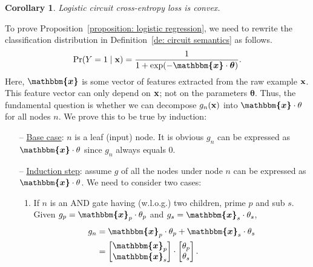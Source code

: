 \documentclass[letterpaper]{article} %
\newtheorem{corollary}{Corollary}
\newcommand{\node}{n}
\newcommand{\coe}{g}
\newcommand{\sample}{{\bf x}}
\begin{document}
\begin{corollary}
Logistic circuit cross-entropy loss is convex.
\end{corollary}

To prove Proposition~\ref{proposition: logistic regression}, we need to rewrite the classification distribution in Definition~\ref{de: circuit semantics} as follows.
$$
{\Pr} ( Y = 1 \mid {\bf x}) = \frac{1}{1+ \exp(- \bm{\mathbbm{x}} \cdot {\bm \theta})}.
$$
Here, $\bm{\mathbbm{x}}$ is some vector of features extracted from the raw example $\bf x$. This feature vector can only depend on $\bf x$; not on the parameters $\bm \theta$.
Thus, the fundamental question is whether we can decompose $\coe_n(\sample)$ into $\bm{\mathbbm{x}} \cdot {\bf \theta}$ for all nodes $n$. We prove this to be true by induction:
\begin{itemize}
\item[--] \underline{Base case}: $\node$ is a leaf (input) node. It is obvious $\coe_n$ can be expressed as $\bm{\mathbbm{x}} \cdot {\bf \theta}$ since $\coe_n$ always equals 0.


\item[--] \underline{Induction step}: assume $\coe$ of all the nodes under node $n$ can be expressed as $\bm{\mathbbm{x}} \cdot {\bf \theta}$. We need to consider two cases:
\begin{enumerate}[wide=0pt, leftmargin=\dimexpr\labelwidth + 2\labelsep\relax]

\item If $\node$ is an AND gate having (w.l.o.g.) two children, prime $p$ and sub $s$. Given $\coe_{p} = \bm{\mathbbm{x}}_{p} \cdot \theta_{p}$ and $\coe_{s} =\bm{\mathbbm{x}}_s \cdot \theta_s$,
\begin{align*}
\coe_\node &=  \bm{\mathbbm{x}}_{p} \cdot \theta_{p} + \bm{\mathbbm{x}}_s \cdot \theta_s \\
&= \begin{bmatrix}
\bm{\mathbbm{x}}_p \\
\bm{\mathbbm{x}}_s
\end{bmatrix}
\cdot
\begin{bmatrix}
\theta_p \\
\theta_s
\end{bmatrix}.
\end{align*}


\end{enumerate}
\end{itemize}
\end{document}
